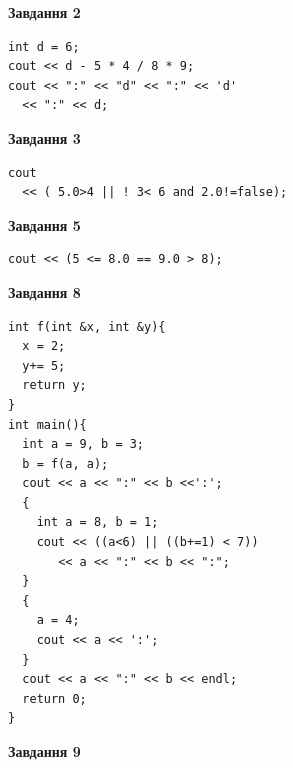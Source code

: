 \documentclass[12pt, ukrainian]{article}
\begin{document}
{\begin {large}
\begin{minipage}[t]{7.0cm}
\end{minipage}
\vline \hspace{1mm}
\begin{minipage}[t]{11.0cm}

\begin{center}
\textbf{Завдання 2}
\end{center}
\vspace{-8mm}

\begin{verbatim}
int d = 6;
cout << d - 5 * 4 / 8 * 9;
cout << ":" << "d" << ":" << 'd' 
  << ":" << d;
\end{verbatim}



\begin{center}
\textbf{Завдання 3}
\end{center}
\vspace{-8mm}

\begin{verbatim}
cout 
  << ( 5.0>4 || ! 3< 6 and 2.0!=false);
\end{verbatim}



\begin{center}
\textbf{Завдання 5}
\end{center}
\vspace{-8mm}

\begin{verbatim}
cout << (5 <= 8.0 == 9.0 > 8);
\end{verbatim}



\begin{center}
\textbf{Завдання 8}
\end{center}
\vspace{-8mm}

\begin{verbatim}
int f(int &x, int &y){
  x = 2;
  y+= 5;
  return y;
}
int main(){
  int a = 9, b = 3;
  b = f(a, a);
  cout << a << ":" << b <<':';
  {
    int a = 8, b = 1;
    cout << ((a<6) || ((b+=1) < 7))
       << a << ":" << b << ":";
  }
  {
    a = 4;
    cout << a << ':';
  }
  cout << a << ":" << b << endl;
  return 0;
}
\end{verbatim}

\end{minipage}


\begin{minipage}[t]{7.0cm}

\begin{center}
\textbf{Завдання 9}
\end{center}
\vspace{-8mm}


\end{minipage}
\end{large}}
\end{document}
